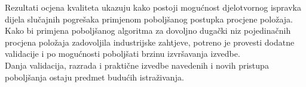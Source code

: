 \documentclass[a4paper,twoside,12pt]{memoir} %
\begin{document}
Rezultati ocjena kvaliteta ukazuju kako postoji mogućnost djelotvornog ispravka dijela
slučajnih pogrešaka primjenom poboljšanog postupka procjene položaja.\\
Kako bi primjena poboljšanog algoritma za dovoljno dugački niz pojedinačnih procjena položaja zadovoljila
industrijske zahtjeve, potreno je provesti dodatne validacije i po mogućnosti poboljšati brzinu izvršavanja izvedbe.\\
Danja validacija, razrada i praktične izvedbe navedenih i novih pristupa poboljšanja
ostaju predmet budućih istraživanja.


\end{document}
